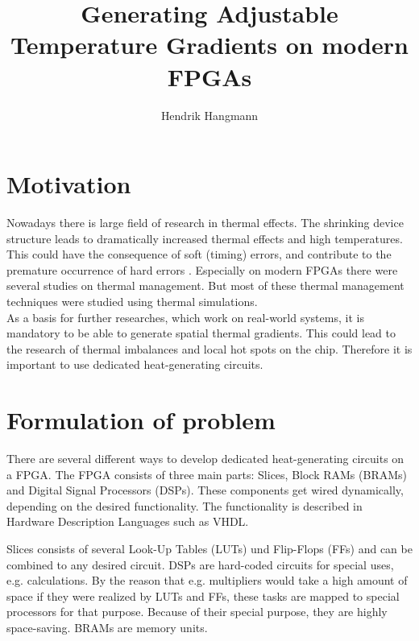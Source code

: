 \documentclass[12pt,twoside,doublepage]{article}
\title{Generating Adjustable Temperature Gradients on modern FPGAs}
\author{Hendrik Hangmann}
\begin{document}
\maketitle
\thispagestyle{empty}




\section{Motivation}
\label{sec:motivation}

Nowadays there is large field of research in thermal effects. The shrinking device structure leads to dramatically increased thermal effects and
high temperatures. This could have the consequence of soft (timing) errors, and contribute to the premature occurrence of hard errors \cite{Borkar2005}. Especially on modern FPGAs there were several studies on thermal management. But most of these thermal management techniques were studied using thermal simulations.  \\
As a basis for further researches, which work on real-world systems, it is mandatory to be able to generate spatial thermal gradients. This could lead to the research of thermal imbalances and local hot spots on the chip. Therefore it is important to use dedicated heat-generating circuits.

\section{Formulation of problem}
\label{sec:problem}

There are several different ways to develop dedicated heat-generating circuits on a FPGA. The FPGA consists of three main parts: Slices, Block RAMs (BRAMs) and Digital Signal Processors (DSPs). These components get wired dynamically, depending on the desired functionality. The functionality is described in Hardware Description Languages such as VHDL. 

Slices consists of several Look-Up Tables (LUTs) und Flip-Flops (FFs) and can be combined to any desired circuit. DSPs are hard-coded circuits for special uses, e.g. calculations. By the reason that e.g. multipliers would take a high amount of space if they were realized by LUTs and FFs, these tasks are mapped to special processors for that purpose. Because of their special purpose, they are highly space-saving. BRAMs are memory units.
\end{document}
